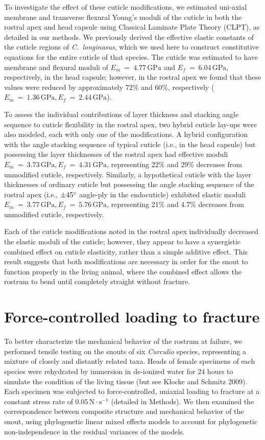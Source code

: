 \documentclass[twocolumn, linenumbers, superscriptaddress, nofootinbib]{revtex4-1}
\begin{document}
		To investigate the effect of these cuticle modifications, we estimated uni-axial membrane and transverse flexural Young's moduli of the cuticle in both the rostral apex and head capsule using Classical Laminate Plate Theory (CLPT), as detailed in our methods.
		We previously derived the effective elastic constants of the cuticle regions of \textit{C.~longinasus}, which we used here to construct constitutive equations for the entire cuticle of that species.
		The cuticle was estimated to have membrane and flexural moduli of $E_m~=~4.77\,\text{GPa}$ and $E_f~=~6.04\,\text{GPa}$, respectively, in the head capsule; however, in the rostral apex we found that these values were reduced by approximately 72\% and 60\%, respectively ($E_m~=~1.36\,\text{GPa}, E_f~=~2.44\,\text{GPa}$).
		
		To assess the individual contributions of layer thickness and stacking angle sequence to cuticle flexibility in the rostral apex, two hybrid cuticle lay-ups were also modeled, each with only one of the modifications.
		A hybrid configuration with the angle stacking sequence of typical cuticle (i.e., in the head capsule) but possessing the layer thicknesses of the rostral apex had effective moduli $E_m~=~3.73\,\text{GPa}, E_f~=~4.31\,\text{GPa}$, representing 22\% and 29\% decreases from unmodified cuticle, respectively.
		Similarly, a hypothetical cuticle with the layer thicknesses of ordinary cuticle but possessing the angle stacking sequence of the rostral apex (i.e., $\pm45\degree$ angle-ply in the endocuticle) exhibited elastic moduli $E_m~=~3.77\,\text{GPa}, E_f~=~5.76\,\text{GPa}$, representing 21\% and 4.7\% decreases from unmodified cuticle, respectively.
		
		
		Each of the cuticle modifications noted in the rostral apex individually decreased the elastic moduli of the cuticle; however, they appear to have a synergistic combined effect on cuticle elasticity, rather than a simple additive effect.
		This result suggests that both modifications are necessary in order for the snout to function properly in the living animal, where the combined effect allows the rostrum to bend until completely straight without fracture.
		
	\section{Force-controlled loading to fracture}
		To better characterize the mechanical behavior of the rostrum at failure, we performed tensile testing on the snouts of six \textit{Curculio} species, representing a mixture of closely and distantly related taxa.
		Heads of female specimens of each species were rehydrated by immersion in de-ionized water for 24 hours to simulate the condition of the living tissue (but see Klocke and Schmitz 2009).
		Each specimen was subjected to force-controlled, uniaxial loading to fracture at a constant stress rate of $0.05\,\text{N}\cdot\text{s}^{-1}$ (detailed in Methods).
		We then examined the correspondence between composite structure and mechanical behavior of the snout, using phylogenetic linear mixed effects models to account for phylogenetic non-independence in the residual variances of the models.
\end{document}
